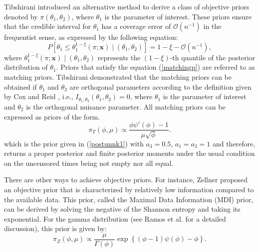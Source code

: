 \documentclass[]{interact}
\theoremstyle{plain}%
\theoremstyle{definition}
\theoremstyle{remark}
\begin{document}
Tibshirani \cite{tibshirani1989noninformative} introduced an alternative method to derive a class of objective priors denoted by $\pi\left(\theta_1, \theta_2\right)$, where $\theta_1$ is the parameter of interest. These priors ensure that the credible interval for $\theta_1$ has a coverage error of $\mathcal{O}\left(n^{-1}\right)$ in the frequentist sense, as expressed by the following equation:
\begin{equation}\label{matchingp}
P\left[\theta_1\leq\theta_1^{1-\xi}\left(\pi;\bm{x}\right) \mid \left(\theta_1,\theta_2\right)\right] =
1-\xi-\mathcal{O}\left(n^{-1}\right),
\end{equation}
where $\theta_1^{1-\xi}\left(\pi;\bm{x}\right) \mid \left(\theta_1,\theta_2\right)$ represents the $(1-\xi)$-th quantile of the posterior distribution of $\theta_1$. Priors that satisfy the equation (\ref{matchingp}) are referred to as matching priors. Tibshirani \cite{tibshirani1989noninformative} demonstrated that the matching priors can be obtained if $\theta_1$ and $\theta_2$ are orthogonal parameters according to the definition given by Cox and Reid \cite{cox1987parameter}, i.e., $I_{\theta_1, \theta_2}\left(\theta_1, \theta_2\right)=0$, where $\theta_1$ is the parameter of interest and $\theta_2$ is the orthogonal nuisance parameter. All matching priors can be expressed as priors of the form.
\begin{equation*}%
\pi_{T}\left(\phi,\mu\right)\propto \frac{\phi\psi'(\phi)-1}{\mu\sqrt{\phi}}.
\end{equation*}
which is the prior given in (\ref{postunnk1}) with $a_3=0.5$, $a_1=a_2=1$ and therefore, returns a proper posterior and finite posterior moments under the usual condition on the uncensored times being not empty nor all equal.


There are other ways to achieve objective priors. For instance, Zellner \cite{zellner1,zellner2} proposed an objective prior that is characterized by relatively low information compared to the available data. This prior, called the Maximal Data Information (MDI) prior, can be derived by solving the negative of the Shannon entropy and taking its exponential. For the gamma distribution (see Ramos et al. \cite{ramos2020posterior} for a detailed discussion), this prior is given by:
\begin{equation*}%
\pi_Z(\phi, \mu)\propto\frac{\mu}{\Gamma(\phi)}\exp\left\{(\phi-1)\psi(\phi)-\phi\right\}.
\end{equation*}
\end{document}
